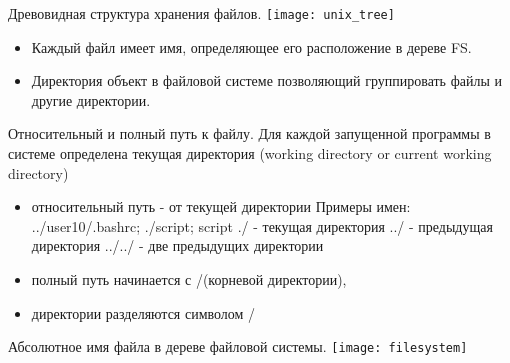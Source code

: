 
\begin{frame}{Древовидная структура хранения файлов.}
\texttt{[image: unix\_tree]} 
  \begin{itemize}
    \item Каждый файл имеет \alert{имя}, определяющее его расположение в дереве FS.
    \item \alert{Директория} объект в файловой системе позволяющий группировать файлы и другие директории.
  \end{itemize}
\end{frame}

\begin{frame}[fragile]{Относительный и полный путь к файлу.}
 Для каждой запущенной программы в системе определена \alert{текущая директория} 
 (working directory or current working directory) 
  \begin{itemize}
    \item \alert{относительный путь} - от текущей директории \newline
      Примеры имен: ../user10/.bashrc; ./script; script \newline
        \alert{./} - текущая директория \newline 
        \alert{../} - предыдущая директория \newline 
        \alert{../../} - две предыдущих директории 
    \item \alert{полный путь} начинается с \alert{/}(корневой директории), 
    \item директории разделяются символом \alert{/} \newline
  \end{itemize}
\end{frame}


\begin{frame}{Абсолютное имя файла в дереве файловой системы.}
\texttt{[image: filesystem]} 
\end{frame}

%
%

